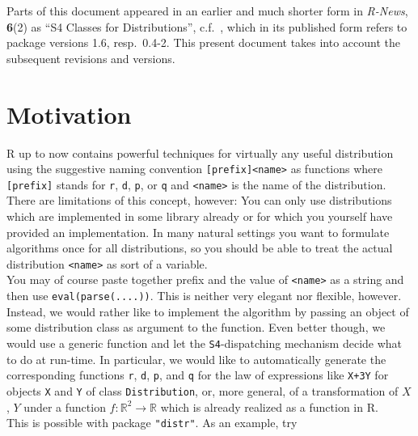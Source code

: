 \documentclass[11pt]{article}
\newcommand{\code}[1]{{\tt #1}}
\newcommand{\pkg}[1]{{\tt "#1"}}
\newcommand{\Reals}{\mathbb{R}}
\begin{document}
\tableofcontents
\noindent
{\small Parts of this document appeared in an earlier and much shorter form in
{\em R-News\/}, {\bf 6}(2) as {\sf ``S4 Classes for Distributions''},
c.f.\ \cite{R:K:S:C:04}, which in its
published form refers to package versions 1.6, resp.\ 0.4-2. This present document
takes into account the subsequent revisions and versions.}\medskip
\addtocounter{section}{-1}
\section{Motivation}
{\sf R} up to now contains powerful techniques for virtually
any useful distribution using the suggestive naming convention
{\tt [prefix]<name>} as functions where {\tt [prefix]} stands for
 {\tt r}, {\tt d}, {\tt p}, or {\tt q}
 and {\tt <name>} is the name of the distribution.\\
There are limitations of this concept, however:
You can only use distributions which are implemented in some library
already or for which you yourself have provided an implementation.
In many natural settings you want to formulate algorithms once for
all distributions, so you should be able to treat the actual distribution
{\tt <name>} as sort of a variable.\\
You may of course paste together prefix and the value of {\tt <name>} as a
string and then use \code{eval(parse(....))}. This is neither very elegant nor
flexible, however.\\
%
Instead, we would rather like to implement the algorithm by passing an object of
some distribution class as argument to the function. Even better though, we
would use a generic function and let the {\tt S4}-dispatching mechanism decide
what to do at run-time. In particular, we would like to automatically generate
the corresponding functions {\tt r}, {\tt d}, {\tt p}, and {\tt q} for the law
of expressions like \code{X+3Y} for objects \code{X} and \code{Y} of class
\code{Distribution}, or, more general, of a transformation of $X$, $Y$ under a
function $f\colon \Reals^2 \to \Reals$ which is already realized as a function
in {\sf R}.\\
This is possible with package \pkg{distr}. As an example, try
\end{document}
